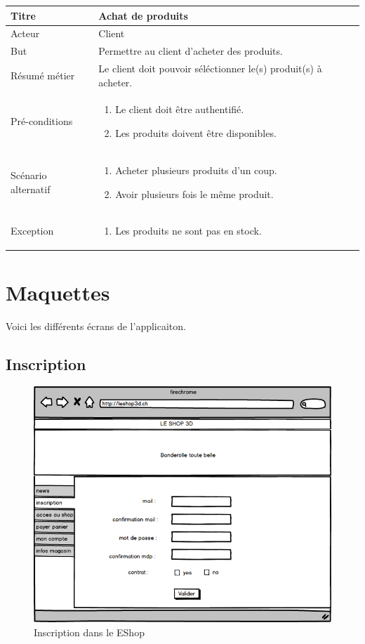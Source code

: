 \documentclass[12pt]{article}
\newcommand\addrow[2]{#1 &#2\\ }
\newcommand\addheading[2]{\textbf{#1} &#2\\ \hline}
\newcommand\tabularhead{\begin{tabular}{lp{11cm}}
\hline
}
\newcommand\addmulrow[2]{ \begin{minipage}[t][][t]{3.5cm}#1\end{minipage}%
    &\begin{minipage}[t][][t]{11cm}
    \begin{enumerate} #2   \end{enumerate}
    \end{minipage}\\ }
\newenvironment{usecase}{\tabularhead}
{\hline\end{tabular}}
\begin{document}
\begin{usecase}
    \addheading{Titre}{Achat de produits}
    \addrow{Acteur}{Client}
    \addrow{But}{Permettre au client d'acheter des produits.}
    \addrow{Résumé métier}{Le client doit pouvoir séléctionner le(s) produit(s) à acheter.}
    \addmulrow{Pré-conditions}{
    \item Le client doit être authentifié.
    \item Les produits doivent être disponibles.
    }
    \addmulrow{Scénario alternatif}{
    \item Acheter plusieurs produits d'un coup.
    \item Avoir plusieurs fois le même produit.
    }
    \addmulrow{Exception}{
    \item Les produits ne sont pas en stock.
    }
\end{usecase}

\newpage
\section{Maquettes}

Voici les différents écrans de l'applicaiton.

\subsection{Inscription}

\begin{figure}[ht]
    \center
    \includegraphics[scale=0.6]{../Maquettes/inscription.jpeg}
    \caption*{Inscription dans le EShop}
\end{figure}
\end{document}
